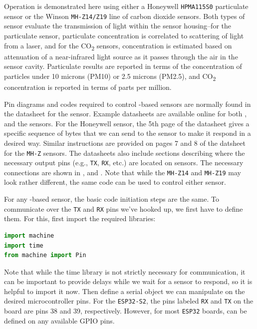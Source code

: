 Operation is demonstrated here using either a Honeywell \texttt{HPMA115S0} particulate sensor or the Winson \texttt{MH-Z14/Z19} line of carbon dioxide sensors.
Both types of sensor evaluate the transmission of light within the sensor housing--for the particulate sensor, particulate concentration is correlated to scattering of light from a laser, and for the CO\textsubscript{2} sensors, concentration is estimated based on attenuation of a near-infrared light source as it passes through the air in the sensor cavity. Particulate results are reported in terms of the concentration of particles under 10 microns (PM10) or 2.5 microns (PM2.5), and CO\textsubscript{2} concentration is reported in terms of parts per million.

Pin diagrams and codes required to control \uart-based sensors are normally found in the datasheet for the sensor. Example datasheets are available online for both , and the   sensors.
For the Honeywell sensor, the 5th page of the datasheet gives a specific sequence of bytes that we can send to the sensor to make it respond in a desired way.
Similar instructions are provided on pages 7 and 8 of the datsheet for the \texttt{MH-Z} sensors.  The datasheets also include sections describing where the necessary output pins (e.g., \texttt{TX}, \texttt{RX}, etc.) are located on sensors.
The necessary connections are shown in ,   and . Note that while the \texttt{MH-Z14} and \texttt{MH-Z19} may look rather different, the same code can be used to control either sensor.

For any \uart -based sensor, the basic code initiation steps are the same.
To communicate over the \texttt{TX} and \texttt{RX} pins we’ve hooked up, we first have to define them.  
For this, first import the required libraries:
\begin{lstlisting}[language=Python]
import machine
import time
from machine import Pin
\end{lstlisting}

Note that while the time library is not strictly necessary for \uart communication, it can be important to provide delays while we wait for a sensor to respond, so it is helpful to import it now.
Then define a serial object we can manipulate on the desired microcontroller pins. For the \texttt{ESP32-S2}, the pins labeled \texttt{RX} and \texttt{TX} on the board are pins 38 and 39, respectively.
However, for most \texttt{ESP32} boards, \uart can be defined on any available GPIO pins.
 

